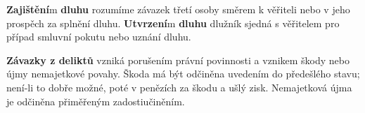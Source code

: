 \textbf{Zajištění}m \textbf{dluhu} rozumíme závazek třetí osoby směrem k věřiteli nebo v jeho prospěch za splnění dluhu. \textbf{Utvrzení}m \textbf{dluhu} dlužník sjedná s věřitelem pro případ smluvní pokutu nebo uznání dluhu.

\textbf{Závazky z deliktů} vzniká porušením právní povinnosti a vznikem škody nebo újmy nemajetkové povahy. Škoda má být odčiněna uvedením do předešlého stavu; není-li to dobře možné, poté v penězích za škodu a ušlý zisk. Nemajetková újma je odčiněna přiměřeným zadostiučiněním.
